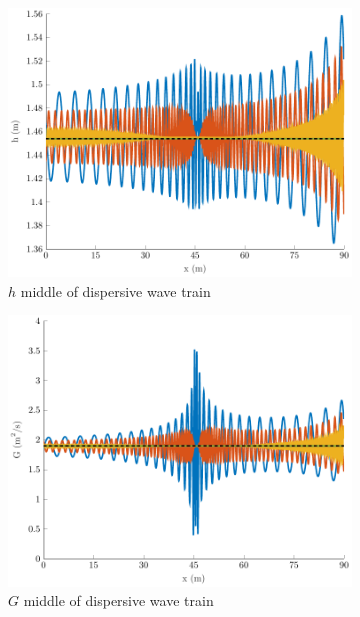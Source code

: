 \documentclass[10pt]{article}
\begin{document}
\begin{figure}
	\centering
	\begin{subfigure}{0.32\textwidth}
		\centering
		\includegraphics[width=\textwidth]{./Figures/Simulations/Study/Serre2SWWECloser/hMid.pdf}
		\caption{$h$ middle of dispersive wave train}
	\end{subfigure}
	\begin{subfigure}{0.32\textwidth}
		\centering
		\includegraphics[width=\textwidth]{./Figures/Simulations/Study/Serre2SWWECloser/GMid.pdf}
		\caption{$G$ middle of dispersive wave train}
	\end{subfigure}
	\begin{subfigure}{0.32\textwidth}

\end{subfigure}
\end{figure}
\end{document}
